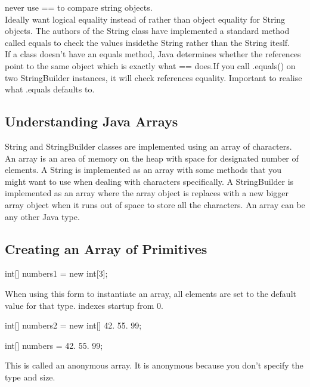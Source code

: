 \documentclass[a4paper]{report}   %
\begin{document}
never use == to compare string objects.\\

Ideally want logical equality instead of rather than object equality for String objects. The authors of the String class have implemented a standard method called equals to check the values insidethe String rather than the String iteslf.\\

If a class doesn't have an equals method, Java determines whether the references point to the same object which is exactly what == does.If you call .equals() on two StringBuilder instances, it will check references equality. Important to realise what .equals defaults to.

\subsection{Understanding Java Arrays}

String and StringBuilder classes are implemented using an array of characters. An array is an area of memory on the heap with space for designated number of elements. A String is implemented as an array with some methods that you might want to use when dealing with characters specifically. A StringBuilder is implemented as an array where the array object is replaces with a new bigger array object when it runs out of space to store all the characters. An array can be any other Java type.

\subsection{Creating an Array of Primitives}
\begin{lstlistings}
	int[] numbers1 = new int[3];
\end{lstlistings}

When using this form to instantiate an array, all elements are set to the default value for that type. indexes startup from 0.

\begin{lstlistings}
	int[] numbers2 = new int[] {42. 55. 99};
\end{lstlistings}

\begin{lstlistings}
	int[] numbers = {42. 55. 99};
\end{lstlistings}

This is called an anonymous array. It is anonymous because you don't specify the type and size.
\end{document}

